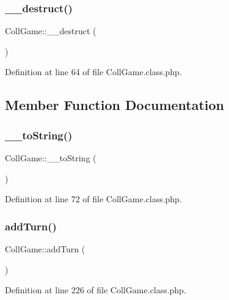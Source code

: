 \subsubsection{\texorpdfstring{\+\_\+\+\_\+destruct()}{\_\_destruct()}}
{\footnotesize\ttfamily Coll\+Game\+::\+\_\+\+\_\+destruct (\begin{DoxyParamCaption}{ }\end{DoxyParamCaption})}



Definition at line 64 of file Coll\+Game.\+class.\+php.



\subsection{Member Function Documentation}
\mbox{\label{class_coll_game_a5ff4e16aeaa7229cde0ccae3ab4c1491}} 
\subsubsection{\texorpdfstring{\+\_\+\+\_\+to\+String()}{\_\_toString()}}
{\footnotesize\ttfamily Coll\+Game\+::\+\_\+\+\_\+to\+String (\begin{DoxyParamCaption}{ }\end{DoxyParamCaption})}



Definition at line 72 of file Coll\+Game.\+class.\+php.

\mbox{\label{class_coll_game_a836082d38e7b85dcbb23407784ddfa94}} 
\subsubsection{\texorpdfstring{add\+Turn()}{addTurn()}}
{\footnotesize\ttfamily Coll\+Game\+::add\+Turn (\begin{DoxyParamCaption}{ }\end{DoxyParamCaption})}



Definition at line 226 of file Coll\+Game.\+class.\+php.

\mbox{\label{class_coll_game_a3230ec46cb3b4e446ecbdd7d1493d688}} 
